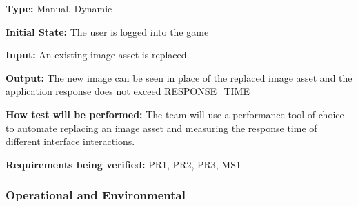 \documentclass[12pt, titlepage]{article}
\begin{document}
\begin{enumerate}
\textbf{Type:} Manual, Dynamic
					
\textbf{Initial State:} The user is logged into the game
					
\textbf{Input: }An existing image asset is replaced
					
\textbf{Output:} The new image can be seen in place of the replaced image asset and the application response does not exceed RESPONSE\_TIME
					
\textbf{How test will be performed: }The team will use a performance tool of choice to automate replacing an image asset and measuring the response time of different interface interactions.

\textbf{Requirements being verified:} PR1, PR2, PR3, MS1
\end{enumerate}

\subsubsection{Operational and Environmental}
\end{document}
